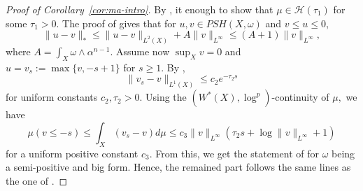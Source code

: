 \documentclass{amsart}
\newcommand{\al}{\alpha}
\newcommand{\om}{\omega}
\newcommand{\cH}{\mathcal{H}}
\theoremstyle{definition}
\numberwithin{thm}{section}
\numberwithin{equation}{section}
\renewcommand{\[}{\begin{equation}}
\renewcommand{\]}{\end{equation}}
\newcommand{\wed}{\wedge}
\begin{document}
\begin{proof}[Proof of Corollary~\ref{cor:ma-intro}] 
By \cite[Theorem~2.1]{EGZ09}, it enough to show that $\mu \in \cH(\tau_1)$ for some $\tau_1>0$. The proof of \cite[Lemma~3.3]{DKN} gives that for $u, v \in PSH(X,\om)$ and $v\leq u \leq 0$,
$$
	\|u - v\|_*  \leq  \|u-v\|_{L^2(X)} + A \|v\|_{L^\infty} \leq (A+1) \|v\|_{L^\infty},
$$
where $A = \int_X \om \wed \al^{n-1}$. Assume now $\sup_X v=0$ and $u= v_s:= \max\{v, -s +1\}$ for $s\geq 1$. By \cite[Eq. (3.5)]{DKN},
$$
	\| v_s -v \|_{L^1(X)} \leq  c_2 e^{-\tau_2 s}
$$
for uniform constants $c_2, \tau_2>0$. Using the $(W^*(X), \log^p)$-continuity of $\mu,$ we have
$$
	\mu(v\leq -s) \leq \int_X (v_s -v)d\mu  \leq c_3 \|v\|_{L^\infty} (\tau_2 s + \log\|v\|_{L^\infty} +1)
$$
for a uniform positive constant $c_3$. From this, we get  the statement of \cite[Lemma~3.7]{DKN} for $\om$ being a semi-positive and big form. Hence, the remained part follows the same lines  as the one of \cite[Theorem~3.6]{DKN}. 
\end{proof}
\end{document}
